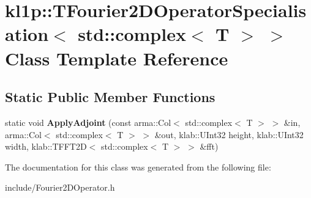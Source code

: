 \hypertarget{classkl1p_1_1TFourier2DOperatorSpecialisation_3_01std_1_1complex_3_01T_01_4_01_4}{}\section{kl1p\+:\+:T\+Fourier2\+D\+Operator\+Specialisation$<$ std\+:\+:complex$<$ T $>$ $>$ Class Template Reference}
\label{classkl1p_1_1TFourier2DOperatorSpecialisation_3_01std_1_1complex_3_01T_01_4_01_4}
\subsection*{Static Public Member Functions}
\begin{DoxyCompactItemize}
\item 
static void {\bfseries Apply\+Adjoint} (const arma\+::\+Col$<$ std\+::complex$<$ T $>$ $>$ \&in, arma\+::\+Col$<$ std\+::complex$<$ T $>$ $>$ \&out, klab\+::\+U\+Int32 height, klab\+::\+U\+Int32 width, klab\+::\+T\+F\+F\+T2D$<$ std\+::complex$<$ T $>$ $>$ \&fft)\hypertarget{classkl1p_1_1TFourier2DOperatorSpecialisation_3_01std_1_1complex_3_01T_01_4_01_4_a8009fbf9e8804e49af45e3a4846e17b2}{}\label{classkl1p_1_1TFourier2DOperatorSpecialisation_3_01std_1_1complex_3_01T_01_4_01_4_a8009fbf9e8804e49af45e3a4846e17b2}

\end{DoxyCompactItemize}


The documentation for this class was generated from the following file\+:\begin{DoxyCompactItemize}
\item 
include/Fourier2\+D\+Operator.\+h\end{DoxyCompactItemize}
